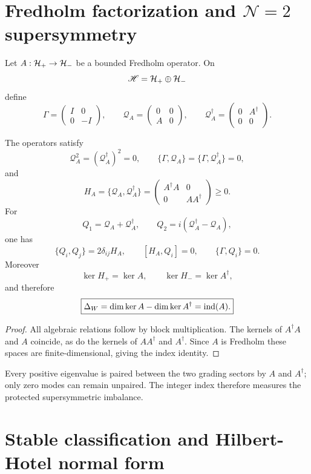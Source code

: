 \section{Fredholm factorization and $\mathcal N=2$ supersymmetry}

Let $A:\mathcal H_+\to\mathcal H_-$ be a bounded Fredholm operator. On
\[
\mathscr H=\mathcal H_+\oplus\mathcal H_-
\]
define
\[
\Gamma=
\begin{pmatrix}
I&0\\
0&-I
\end{pmatrix},
\qquad
\mathcal Q_A=
\begin{pmatrix}
0&0\\
A&0
\end{pmatrix},
\qquad
\mathcal Q_A^\dagger=
\begin{pmatrix}
0&A^\dagger\\
0&0
\end{pmatrix}.
\]

\begin{theorem}\label{thm:fredholm-susy}
The operators satisfy
\[
\mathcal Q_A^2=(\mathcal Q_A^\dagger)^2=0,
\qquad
\{\Gamma,\mathcal Q_A\}
=
\{\Gamma,\mathcal Q_A^\dagger\}
=0,
\]
and
\[
H_A
=
\{\mathcal Q_A,\mathcal Q_A^\dagger\}
=
\begin{pmatrix}
A^\dagger A&0\\
0&AA^\dagger
\end{pmatrix}
\ge0.
\]
For
\[
Q_1=\mathcal Q_A+\mathcal Q_A^\dagger,
\qquad
Q_2=i(\mathcal Q_A^\dagger-\mathcal Q_A),
\]
one has
\[
\boxed{\{Q_i,Q_j\}=2\delta_{ij}H_A},
\qquad
[H_A,Q_i]=0,
\qquad
\{\Gamma,Q_i\}=0.
\]
Moreover
\[
\ker H_+=\ker A,
\qquad
\ker H_-=\ker A^\dagger,
\]
and therefore
\[
\boxed{
\Delta_W
=
\dim\ker A-\dim\ker A^\dagger
=
\operatorname{ind}(A).
}
\]
\end{theorem}

\begin{proof}
All algebraic relations follow by block multiplication. The kernels of $A^\dagger A$ and $A$ coincide, as do the kernels of $AA^\dagger$ and $A^\dagger$. Since $A$ is Fredholm these spaces are finite-dimensional, giving the index identity.
\end{proof}

Every positive eigenvalue is paired between the two grading sectors by $A$ and $A^\dagger$; only zero modes can remain unpaired. The integer index therefore measures the protected supersymmetric imbalance.

\section{Stable classification and Hilbert-Hotel normal form}

